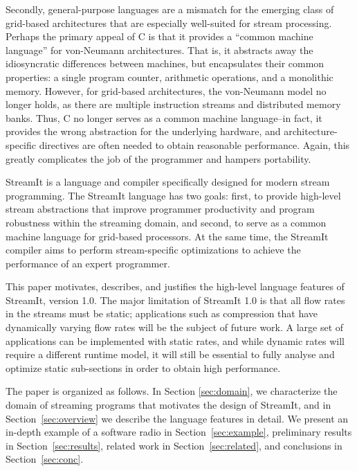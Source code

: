 Secondly, general-purpose languages are a mismatch for the emerging
class of grid-based architectures \cite{smartmemories,rawshort,trips} that
are especially well-suited for stream processing.  Perhaps the primary
appeal of C is that it provides a ``common machine language'' for
von-Neumann architectures.  That is, it abstracts away the
idiosyncratic differences between machines, but encapsulates their
common properties: a single program counter, arithmetic operations,
and a monolithic memory.  However, for grid-based architectures, the
von-Neumann model no longer holds, as there are multiple instruction
streams and distributed memory banks.  Thus, C no longer serves as a
common machine language--in fact, it provides the wrong abstraction
for the underlying hardware, and architecture-specific directives are
often needed to obtain reasonable performance.  Again, this greatly
complicates the job of the programmer and hampers portability.

StreamIt is a language and compiler specifically designed for modern
stream programming.  The StreamIt language has two goals: first, to
provide high-level stream abstractions that improve programmer
productivity and program robustness within the streaming domain, and
second, to serve as a common machine language for grid-based
processors.  At the same time, the StreamIt compiler aims to perform
stream-specific optimizations to achieve the performance of an expert
programmer.

This paper motivates, describes, and justifies the high-level language
features of StreamIt, version 1.0.  The major limitation of StreamIt
1.0 is that all flow rates in the streams must be static; applications
such as compression that have dynamically varying flow rates will be
the subject of future work.  A large set of applications can be
implemented with static rates, and while dynamic rates will require a
different runtime model, it will still be essential to fully analyse
and optimize static sub-sections in order to obtain high performance.

The paper is organized as follows. In Section {\ref{sec:domain}}, we
characterize the domain of streaming programs that motivates the
design of StreamIt, and in Section~\ref{sec:overview} we describe the
language features in detail.  We present an in-depth example of a
software radio in Section~\ref{sec:example}, preliminary results in
Section~\ref{sec:results}, related work in Section~\ref{sec:related},
and conclusions in Section~\ref{sec:conc}.

